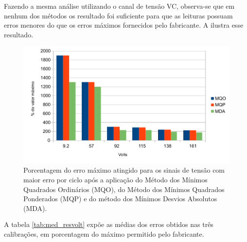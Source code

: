 Fazendo a mesma análise utilizando o canal de tensão VC, observa-se que em nenhum dos métodos os resultado foi suficiente para que as leituras possuam erros menores do que os erros máximos fornecidos pelo fabricante. A  ilustra esse resultado. 

\begin{figure}
    \caption{Porcentagem do erro máximo atingido para os sinais de tensão com maior erro por ciclo após a aplicação do Método dos Mínimos Quadrados Ordinários (MQO), do Método dos Mínimos Quadrados Ponderados (MQP) e do método dos Mínimos Desvios Absolutos (MDA).}
    \label{fig:res_volt}
    \centering
    \includegraphics[width=0.9\linewidth]{pictures/max_err_VC_aftercalib60.pdf}
\end{figure}

A tabela \ref{tab:med_resvolt} expõe as médias dos erros obtidos nas três calibrações, em porcentagem do máximo permitido pelo fabricante.

\begin{table}[htb]
\end{table}


